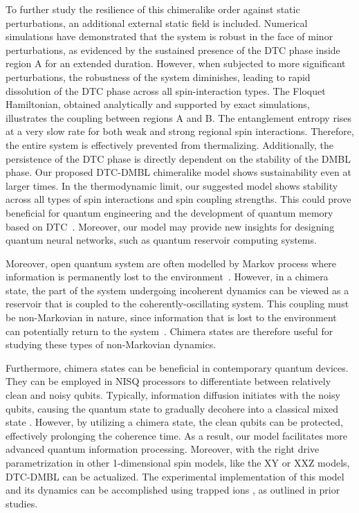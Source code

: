 \documentclass[12pt]{iopart}
\begin{document}
To further study the resilience of this chimeralike order against static perturbations, an additional external static field is included. Numerical simulations have demonstrated that the system is robust in the face of minor perturbations, as evidenced by the sustained presence of the DTC phase inside region A for an extended duration. However, when subjected to more significant perturbations, the robustness of the system diminishes, leading to rapid dissolution of the DTC phase across all spin-interaction types. The Floquet Hamiltonian, obtained analytically and supported by exact simulations, illustrates the coupling between regions A and B. The entanglement entropy rises at a very slow rate for both weak and strong regional spin interactions. Therefore, the entire system is effectively prevented from thermalizing. Additionally, the persistence of the DTC phase is directly dependent on the stability of the DMBL phase. Our proposed DTC-DMBL chimeralike model shows sustainability even at larger times. In the thermodynamic limit, our suggested model shows stability across all types of spin interactions and spin coupling strengths. This could prove beneficial for quantum engineering and the development of quantum memory based on DTC~\cite{zhang_observation_2017}. Moreover, our model may provide new insights for designing quantum neural networks, such as quantum reservoir computing systems\cite{Fujii_2017, Martinez_2021,Mujal_2021, Akitada2022}.

Moreover, open quantum system are often modelled by Markov process where information is permanently lost to the environment~\cite{Agarwal2012, Gorini1976}. However, in a chimera state, the part of the system undergoing incoherent dynamics can be viewed as a reservoir that is coupled to the coherently-oscillating system.
This coupling must be non-Markovian in nature, since information that is lost to the environment can potentially return to the system~\cite{Accardi1976,Lindblad1976}. Chimera states are therefore useful for studying these types of non-Markovian dynamics.

Furthermore, chimera states can be beneficial in contemporary quantum devices. They can be employed in NISQ processors to differentiate between relatively clean and noisy qubits. Typically, information diffusion initiates with the noisy qubits, causing the quantum state to gradually decohere into a classical mixed state \cite{Bharti2022}. However, by utilizing a chimera state, the clean qubits can be protected, effectively prolonging the coherence time. As a result, our model facilitates more advanced quantum information processing. Moreover, with the right drive parametrization in other 1-dimensional spin models, like the XY or XXZ models, DTC-DMBL can be actualized. The experimental implementation of this model and its dynamics can be accomplished using trapped ions \cite{sakurai_phys_nodate, Friedenauer2008}, as outlined in prior studies.
	
\end{document}
